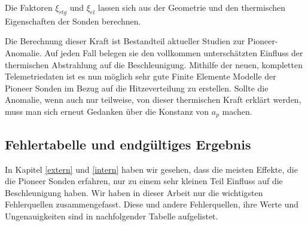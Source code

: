 Die Faktoren $\xi _{\mathit{rtg}}$ und $\xi _{\mathit{el}}$ lassen
sich aus der Geometrie und den thermischen Eigenschaften der Sonden
berechnen\cite{Turyshev2010}.

Die Berechnung dieser Kraft ist Bestandteil aktueller Studien zur
Pioneer-Anomalie. Auf jeden Fall belegen sie den vollkommen
untersch\"atzten Einfluss der thermischen Abstrahlung auf die
Beschleunigung. Mithilfe der neuen, kompletten Telemetriedaten ist es
nun m\"oglich sehr gute Finite Elemente Modelle der Pioneer Sonden im
Bezug auf die Hitzeverteilung zu erstellen. Sollte die Anomalie, wenn
auch nur teilweise, von dieser thermischen Kraft erkl\"art werden, muss
man sich erneut Gedanken \"uber die Konstanz von $a_{p}$ machen.


\bigskip

\subsection{Fehlertabelle und endg\"ultiges Ergebnis}

In Kapitel \ref{extern} und \ref{intern} haben wir gesehen, dass die meisten Effekte, die 
die Pioneer Sonden erfahren, nur zu einem sehr kleinen Teil Einfluss auf die
Beschleunigung haben. Wir haben in dieser Arbeit nur die wichtigsten
Fehlerquellen zusammengefasst. Diese und andere Fehlerquellen, ihre
Werte und Ungenauigkeiten sind in nachfolgender Tabelle aufgelistet.


